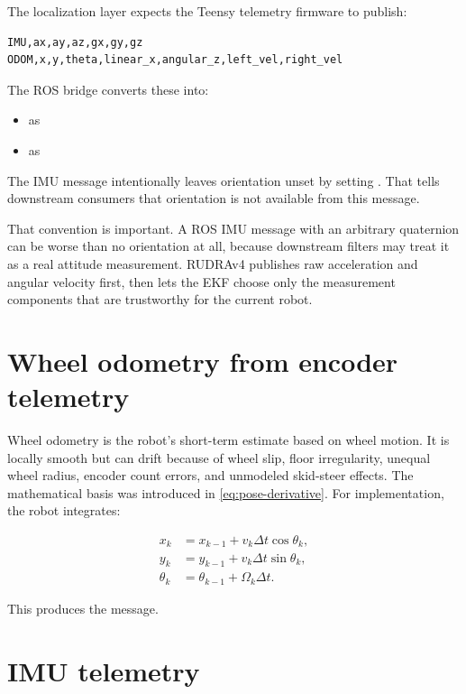 The localization layer expects the Teensy telemetry firmware to publish:

\begin{lstlisting}[language={}]
IMU,ax,ay,az,gx,gy,gz
ODOM,x,y,theta,linear_x,angular_z,left_vel,right_vel
\end{lstlisting}

The ROS bridge converts these into:

\begin{itemize}
  \item {} as 
  \item {} as 
\end{itemize}

The IMU message intentionally leaves orientation unset by setting . That tells downstream consumers that orientation is not available from this message.

That convention is important. A ROS IMU message with an arbitrary quaternion can be worse than no orientation at all, because downstream filters may treat it as a real attitude measurement. RUDRAv4 publishes raw acceleration and angular velocity first, then lets the EKF choose only the measurement components that are trustworthy for the current robot.

\section{Wheel odometry from encoder telemetry}

Wheel odometry is the robot's short-term estimate based on wheel motion. It is locally smooth but can drift because of wheel slip, floor irregularity, unequal wheel radius, encoder count errors, and unmodeled skid-steer effects. The mathematical basis was introduced in \cref{eq:pose-derivative}. For implementation, the robot integrates:

\begin{align}
x_k &= x_{k-1} + v_k\Delta t\cos\theta_k,\\
y_k &= y_{k-1} + v_k\Delta t\sin\theta_k,\\
\theta_k &= \theta_{k-1} + \Omega_k\Delta t.
\end{align}

This produces the  message.

\section{IMU telemetry}

